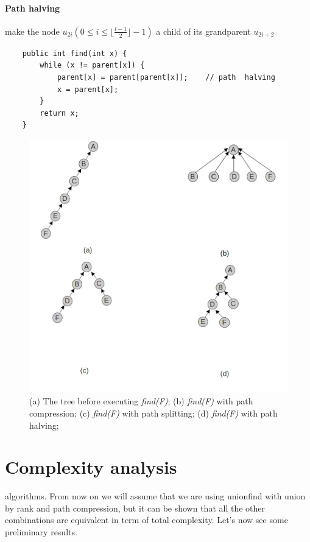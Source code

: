 \documentclass{article}
\begin{document}
\paragraph{Path halving} \cite{van1977alternative} \cite{van1980datastructures} make the node $u_{2i} ( 0 \leq i \leq \lfloor \frac{l-1}{2}\rfloor - 1)$ a child 
of its grandparent $u_{2i+2}$
\begin{lstlisting}
    public int find(int x) {
        while (x != parent[x]) {
            parent[x] = parent[parent[x]];    // path  halving
            x = parent[x];
        }
        return x;
    }
\end{lstlisting}
\begin{figure}[h!]
    \includegraphics[width = \linewidth]{img/pc.jpg}
    \caption{(a) The tree before executing \emph{find(F)};
    (b) \emph{find(F)} with path compression;
    (c) \emph{find(F)} with path splitting;
    (d) \emph{find(F)} with path halving;
    }
    \label{fig:pc}   
\end{figure}

\section{Complexity analysis}\label{complex}
algorithms. From now on we will assume that we are using unionfind with union by rank and path compression,
but it can be shown that all the other combinations are equivalent in term of total complexity.
Let's now see some preliminary results.
\end{document}
